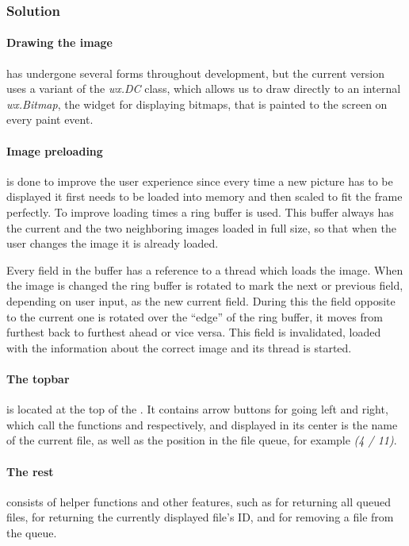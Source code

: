 \subsubsection{Solution} %

\paragraph{Drawing the image} has undergone several forms throughout development,
but the current version uses a variant of the \emph{wx.DC} class, which allows us to draw directly to an internal \emph{wx.Bitmap}, the widget for displaying bitmaps,
that is painted to the screen on every paint event.

\paragraph{Image preloading} is done to improve the user experience since every
time a new picture has to be displayed it first needs to be loaded into memory
and then scaled to fit the frame perfectly. To improve loading times a ring
buffer is used. This buffer always has the current and the two neighboring
images loaded in full size, so that when the user changes the image it is
already loaded.

Every field in the buffer has a reference to a thread which loads the image.
When the image is changed the ring buffer is rotated to mark the next or
previous field, depending on user input, as the new current field. During this
the field opposite to the current one is rotated over the ``edge'' of the ring
buffer, it moves from furthest back to furthest ahead or vice versa. This field
is invalidated, loaded with the information about the correct image and its
thread is started.

\paragraph{The topbar} is located at the top of the . It contains arrow buttons for going left and right, which call the functions  and  respectively, and displayed in its center is the name of the current file, as well as the position in the file queue, for example \emph{(4 / 11)}.

\paragraph{The rest} consists of helper functions and other features, such as 
 for returning all queued files,  for returning the currently displayed file's ID, and  for removing a file from the queue.
